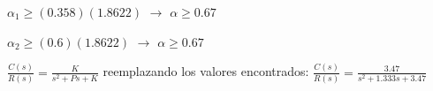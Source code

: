 \documentclass[12pt]{article}
\begin{document}
\begin{enumerate}
\begin{itemize}
        $\alpha_{1} \geq (0.358)(1.8622)$ $\rightarrow$ $\alpha \geq 0.67$
        
        $\alpha_{2} \geq (0.6)(1.8622)$ $\rightarrow$ $\alpha \geq 0.67$


\vspace{0.5cm}

    \(\displaystyle \frac{C(s)}{R(s)} = \frac{K}{s^2 + Ps + K} \) reemplazando
        los valores encontrados: \(\displaystyle \frac{C(s)}{R(s)}=\frac{3.47}{s^2 + 1.333s + 3.47}\)

    \end{itemize}


% 
% 
% 
%
% 
% 
% 
% 


\end{enumerate}
\end{document}
